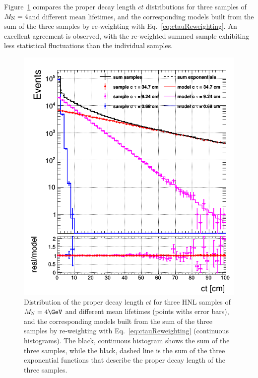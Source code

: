 Figure~\ref{fig:newReweightGen} compares the proper decay length $ct$
distributions for three samples of $M_{\mathrm{N}}=4$\GeV and different mean
lifetimes, and the corresponding models built from the sum of the
three samples by re-weighting with Eq.~\ref{eq:ctauReweighting}. An
excellent agreement is observed, with the re-weighted summed sample
exhibiting less statistical fluctuations than the individual samples.
\begin{figure}[h!]
  \centering
  \includegraphics[width = .5\textwidth]{Figures/c4/reweighting/ctau_genLevel_unskimmed.png}
  \caption{Distribution of the proper decay length $ct$ for three HNL
    samples of $\mhnl=4\GeV$ and different mean lifetimes (points withs
    error bars),
    and the corresponding models built from the sum of the three
    samples by re-weighting with Eq.~\ref{eq:ctauReweighting}
    (continuous histograms). The black, continuous histogram shows the
    sum of the three samples, while the black, dashed line is the sum
    of the three exponential functions that describe the proper decay
    length of the three samples. \dani}
  \label{fig:newReweightGen}
\end{figure}

